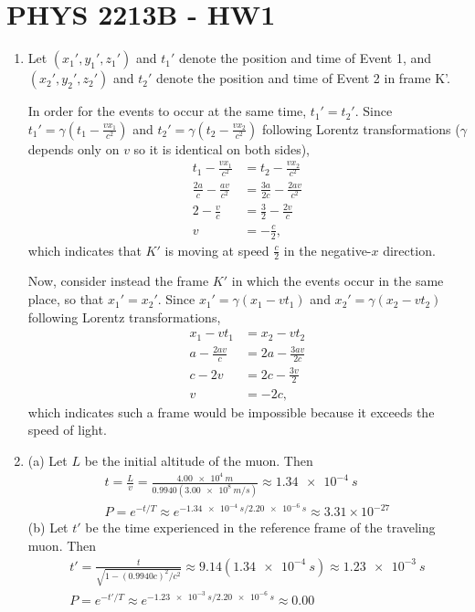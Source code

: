 \documentclass[a4paper,12pt]{article}
\begin{document}
\section*{PHYS 2213B - HW1}

\begin{enumerate}

    \item Let $(x_1', y_1', z_1')$ and $t_1'$ denote the position and time of
    Event 1, and $(x_2', y_2', z_2')$ and $t_2'$ denote the position and
    time of Event 2 in frame K'. \par
    In order for the events to occur at the same time,
    $t_1' = t_2'$. Since $t_1' = \gamma(t_1 - \frac{vx_1}{c^2})$ and $t_2' =
    \gamma(t_2 - \frac{vx_2}{c^2})$ following Lorentz transformations ($\gamma$
    depends only on $v$ so it is identical on both sides),
    \begin{align*}
        t_1 - \frac{vx_1}{c^2}        &= t_2 - \frac{vx_2}{c^2} \\
        \frac{2a}{c} - \frac{av}{c^2} &= \frac{3a}{2c} - \frac{2av}{c^2} \\
        2 - \frac{v}{c}               &= \frac{3}{2} - \frac{2v}{c} \\
        v                             &= -\frac{c}{2},
    \end{align*}
    which indicates that $K'$ is moving at speed $\frac{c}{2}$ in the negative-$x$
    direction. \par
    Now, consider instead the frame $K'$ in which the events occur in the same
    place, so that $x_1' = x_2'$. Since $x_1' = \gamma(x_1 - vt_1)$ and $x_2'
    = \gamma(x_2 - vt_2)$ following Lorentz transformations, 
    \begin{align*}
        x_1 - vt_1        &= x_2 - vt_2 \\
        a - \frac{2av}{c} &= 2a - \frac{3av}{2c} \\
        c - 2v            &= 2c - \frac{3v}{2} \\
        v                 &= -2c,
    \end{align*}
    which indicates such a frame would be impossible because it exceeds the speed of light. \par

    \item (a) Let $L$ be the initial altitude of the muon. Then
    \begin{gather*}
        t = \frac{L}{v} = \frac{\SI{4.00e4}{m}}{0.9940(\SI{3.00e8}{m/s})} \approx \SI{1.34e-4}{s} \\
        P = e^{-t/T} \approx e^{-\SI{1.34e-4}{s} / \SI{2.20e-6}{s}} \approx 3.31 \times 10^{-27}
    \end{gather*}
    (b) Let $t'$ be the time experienced in the reference frame of the traveling muon. Then
	\begin{gather*}
	    t' = \frac{t}{\sqrt{1 - (0.9940c)^2/c^2}} \approx 9.14(\SI{1.34e-4}{s}) \approx \SI{1.23e-3}{s} \\
	    P = e^{-t'/T} \approx e^{-\SI{1.23e-3}{s} / \SI{2.20e-6}{s}} \approx 0.00 
	\end{gather*}
	

\end{enumerate}
\end{document}
